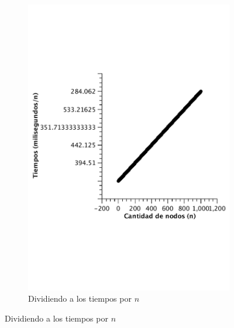 \begin{figure}[H]
        \begin{subfigure}[b]{0.25\textwidth}
                \includegraphics[width=\textwidth]{imagenes/vacio-listas-2.pdf}
                \caption{Dividiendo a los tiempos por $n$}
        \end{subfigure}


\end{figure}
